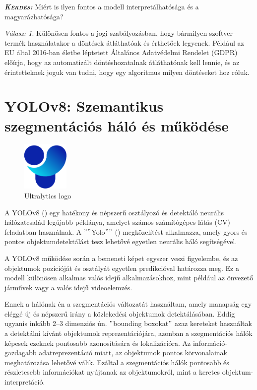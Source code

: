 \documentclass[12pt,oneside,a4paper]{article}
\newcommand{\newsection}[1]{\clearpage\section{#1}}\label{makro}
\theoremstyle{remark}
\newtheorem*{remarkth}{Válasz: \newline}
\newenvironment{remark}{\begin{remarkth}}{\end{remarkth}}
\newenvironment{kerdes}{
    \medskip%
    \par\noindent\ignorespaces%
    \textit{\textsc{\textbf{Kérdés: }}}%
    \medskip
    \textsf%
}{%
\medskip
}
\begin{document}
\begin{kerdes}
    Miért is ilyen fontos a modell interpretálhatósága és a magyarázhatósága?
\end{kerdes}
\begin{remark}
    Különösen fontos a jogi szabályozásban, hogy bármilyen szoftver-termék használatakor a döntések átláthatóak és
    érthetőek legyenek.
    Például az \ac{EU} által 2016-ban életbe léptetett Általános Adatvédelmi Rendelet (\ac{GDPR}) előírja, hogy az
    automatizált döntéshozatalnak átláthatónak kell lennie, és az érintetteknek joguk van tudni, hogy egy algoritmus
    milyen döntéseket hoz róluk.
\end{remark}
\newsection{YOLOv8: Szemantikus szegmentációs háló és működése}\label{sec:yolov8:-szemantikus-szegmentacios-halo}
    \begin{figure}
        \centering
        \includegraphics[width=0.2\textwidth]{Ultralytics}
        \caption{Ultralytics logo}
        \label{fig:Ultralytics}
    \end{figure}
    A YOLOv8 (\cite{Yolov8})\label{irodalomhivatkozas} egy hatékony és népszerű osztályozó és detektáló neurális
    hálózatcsalád legújabb példánya, amelyet számos számítógépes látás (\ac{CV})
    feladatban használnak.
    A \(""\)\gls{Yolo}\(""\) () megközelítést alkalmazza,
    amely gyors és pontos objektumdetektálást tesz lehetővé egyetlen neurális háló segítségével.


    A YOLOv8 működése során a bemeneti képet egyszer veszi figyelembe, és az objektumok pozícióját
    és osztályát egyetlen predikcióval határozza meg.
    Ez a modell különösen alkalmas valós
    idejű alkalmazásokhoz, mint például az önvezető járművek vagy a valós idejű videoelemzés.

    Ennek a hálónak én a szegmentációs változatát használtam, amely manapság egy eléggé új és népszerű
    irány a közlekedési objektumok detektálásában.
    Eddig ugyanis inkább 2--3 dimenziós ún. \("\)bounding boxokat\("\) azaz kereteket használtak a detektálni kívánt
    objektumok reprezentációjára, azonban a szegmentációs hálók képesek  ezeknek pontosabb azonosítására és
    lokalizációra.
    Az információ-gazdagabb  adatreprezentáció miatt, az objektumok pontos körvonalainak meghatározása lehetővé válik.
    Ezáltal a szegmentációs hálók pontosabb és részletesebb információkat nyújtanak az objektumokról,
    mint a keretes objektum-interpretáció.
\end{document}
